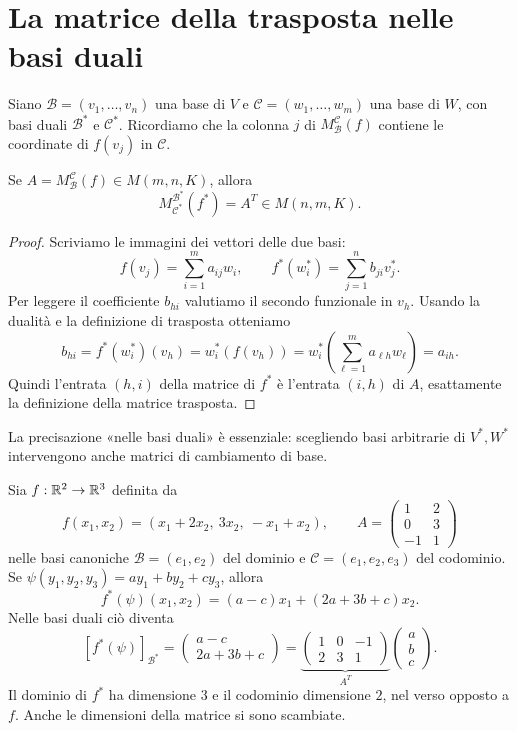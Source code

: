 \section{La matrice della trasposta nelle basi duali}
Siano $\mathcal B=(v_1,\ldots,v_n)$ una base di $V$ e $\mathcal C=(w_1,\ldots,w_m)$ una base di $W$, con basi duali $\mathcal B^*$ e $\mathcal C^*$. Ricordiamo che la colonna $j$ di $M_{\mathcal B}^{\mathcal C}(f)$ contiene le coordinate di $f(v_j)$ in $\mathcal C$.
\begin{teorema}
Se $A=M_{\mathcal B}^{\mathcal C}(f)\in M(m,n,K)$, allora
\[
 M_{\mathcal C^*}^{\mathcal B^*}(f^*)=A^T\in M(n,m,K).
\]
\end{teorema}
\begin{proof}
Scriviamo le immagini dei vettori delle due basi:
\[
 f(v_j)=\sum_{i=1}^m a_{ij}w_i,\qquad
 f^*(w_i^*)=\sum_{j=1}^n b_{ji}v_j^*.
\]
Per leggere il coefficiente $b_{hi}$ valutiamo il secondo funzionale in $v_h$. Usando la dualità e la definizione di trasposta otteniamo
\[
 b_{hi}=f^*(w_i^*)(v_h)=w_i^*(f(v_h))
 =w_i^*\!\left(\sum_{\ell=1}^m a_{\ell h}w_\ell\right)=a_{ih}.
\]
Quindi l'entrata $(h,i)$ della matrice di $f^*$ è l'entrata $(i,h)$ di $A$, esattamente la definizione della matrice trasposta.
\end{proof}
La precisazione «nelle basi duali» è essenziale: scegliendo basi arbitrarie di $V^*,W^*$ intervengono anche matrici di cambiamento di base.

\begin{esempio}
Sia $f:\mathbb{R}^2\to\mathbb{R}^3$ definita da
\[
 f(x_1,x_2)=(x_1+2x_2,\ 3x_2,\ -x_1+x_2),\qquad
 A=\begin{pmatrix}1&2\\0&3\\-1&1\end{pmatrix}
\]
nelle basi canoniche $\mathcal B=(e_1,e_2)$ del dominio e $\mathcal C=(e_1,e_2,e_3)$ del codominio. Se $\psi(y_1,y_2,y_3)=ay_1+by_2+cy_3$, allora
\[
 f^*(\psi)(x_1,x_2)=(a-c)x_1+(2a+3b+c)x_2.
\]
Nelle basi duali ciò diventa
\[
 [f^*(\psi)]_{\mathcal B^*}
 =\begin{pmatrix}a-c\\2a+3b+c\end{pmatrix}
 =\underbrace{\begin{pmatrix}1&0&-1\\2&3&1\end{pmatrix}}_{A^T}
 \begin{pmatrix}a\\b\\c\end{pmatrix}.
\]
Il dominio di $f^*$ ha dimensione $3$ e il codominio dimensione $2$, nel verso opposto a $f$. Anche le dimensioni della matrice si sono scambiate.
\end{esempio}
